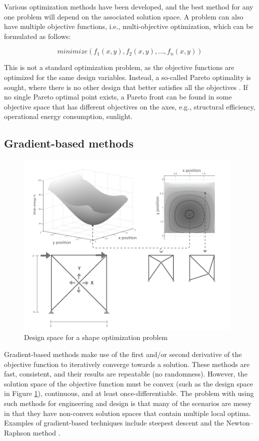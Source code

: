 Various optimization methods have been developed, and the best method for any one problem will depend on the associated solution space. A problem can also have multiple objective functions, i.e., multi-objective optimization, which can be formulated as follows:

\begin{equation*}
minimize(f_1(x,y),f_2(x,y), \dotsc, f_n(x,y))
\end{equation*}

This is not a standard optimization problem, as the objective functions are optimized for the same design variables. Instead, a so-called Pareto optimality is sought, where there is no other design that better satisfies all the objectives \cite{christensen2008introduction}. If no single Pareto optimal point exists, a Pareto front can be found in some objective space that has different objectives on the axes, e.g., structural efficiency, operational energy consumption, sunlight.

\subsection{Gradient-based methods}
\begin{figure}
  \includegraphics[width=310pt]{graphics/designspace.png}
  \caption{Design space for a shape optimization problem}
  \label{fig:designspace}
\end{figure}

Gradient-based methods make use of the first and/or second derivative of the objective function to iteratively converge towards a solution. These methods are fast, consistent, and their results are repeatable (no randomness). However, the solution space of the objective function must be convex (such as the design space in Figure \ref{fig:designspace}), continuous, and at least once-differentiable. The problem with using such methods for engineering and design is that many of the scenarios are messy \cite{schlaich2006challenges} in that they have non-convex solution spaces that contain multiple local optima. Examples of gradient-based techniques include steepest descent and the Newton--Raphson method \cite{christensen2008introduction}. 

